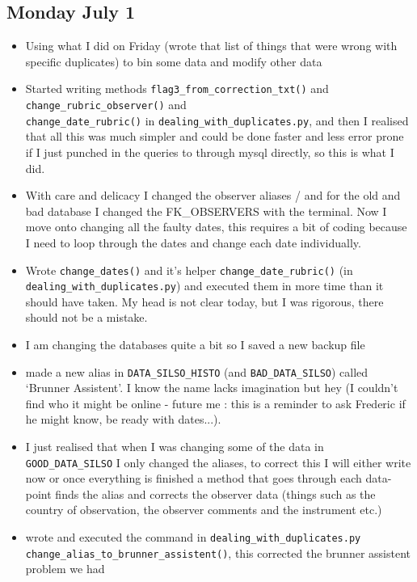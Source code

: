 \documentclass[12pt]{article}
\begin{document}
\subsection{Monday July 1}
\begin{itemize}
    \item Using what I did on Friday (wrote that list of things that were wrong with specific duplicates) to bin some data and modify other data
    \item Started writing methods \texttt{flag3\_from\_correction\_txt()} and \texttt{change\_rubric\_observer()} and\\ \texttt{change\_date\_rubric()} in \texttt{dealing\_with\_duplicates.py}, and then I realised that all this was much simpler and could be done faster and less error prone if I just punched in the queries to through mysql directly, so this is what I did.
    \item With care and delicacy I changed the observer aliases / and for the old and bad database I changed the FK\_OBSERVERS with the terminal. Now I move onto changing all the faulty dates, this requires a bit of coding because I need to loop through the dates and change each date individually.
    \item Wrote \texttt{change\_dates()} and it's helper \texttt{change\_date\_rubric()} (in \texttt{dealing\_with\_duplicates.py}) and executed them in more time than it should have taken. My head is not clear today, but I was rigorous, there should not be a mistake.
    \item I am changing the databases quite a bit so I saved a new backup file
    \item made a new alias in \texttt{DATA\_SILSO\_HISTO} (and \texttt{BAD\_DATA\_SILSO}) called `Brunner Assistent'. I know the name lacks imagination but hey (I couldn't find who it might be online - future me : this is a reminder to ask Frederic if he might know, be ready with dates...).
    \item I just realised that when I was changing some of the data in \texttt{GOOD\_DATA\_SILSO} I only changed the aliases, to correct this I will either write now or once everything is finished a method that goes through each data-point finds the alias and corrects the observer data (things such as the country of observation, the observer comments and the instrument etc.)
    \item wrote and executed the command in \texttt{dealing\_with\_duplicates.py}\\ \texttt{change\_alias\_to\_brunner\_assistent()}, this corrected the brunner assistent problem we had

\end{itemize}
\end{document}
